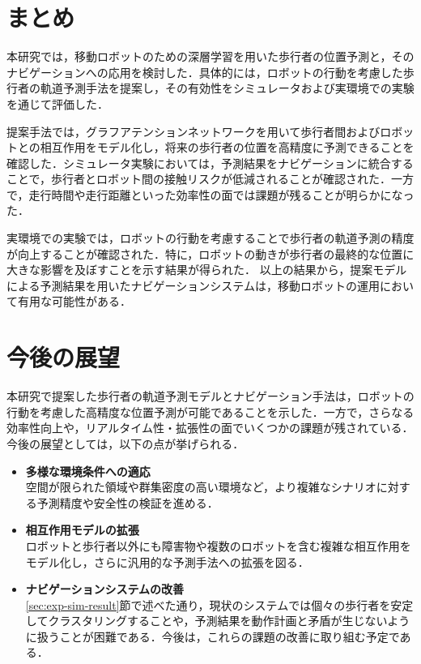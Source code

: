 
\section{まとめ}
本研究では，移動ロボットのための深層学習を用いた歩行者の位置予測と，そのナビゲーションへの応用を検討した．具体的には，ロボットの行動を考慮した歩行者の軌道予測手法を提案し，その有効性をシミュレータおよび実環境での実験を通じて評価した．

提案手法では，グラフアテンションネットワークを用いて歩行者間およびロボットとの相互作用をモデル化し，将来の歩行者の位置を高精度に予測できることを確認した．シミュレータ実験においては，予測結果をナビゲーションに統合することで，歩行者とロボット間の接触リスクが低減されることが確認された．一方で，走行時間や走行距離といった効率性の面では課題が残ることが明らかになった．

実環境での実験では，ロボットの行動を考慮することで歩行者の軌道予測の精度が向上することが確認された．特に，ロボットの動きが歩行者の最終的な位置に大きな影響を及ぼすことを示す結果が得られた．
以上の結果から，提案モデルによる予測結果を用いたナビゲーションシステムは，移動ロボットの運用において有用な可能性がある．

\newpage

\section{今後の展望}
本研究で提案した歩行者の軌道予測モデルとナビゲーション手法は，ロボットの行動を考慮した高精度な位置予測が可能であることを示した．一方で，さらなる効率性向上や，リアルタイム性・拡張性の面でいくつかの課題が残されている．今後の展望としては，以下の点が挙げられる．

\begin{itemize}
  \item \textbf{多様な環境条件への適応} \\
  空間が限られた領域や群集密度の高い環境など，より複雑なシナリオに対する予測精度や安全性の検証を進める．
  \item \textbf{相互作用モデルの拡張} \\
  ロボットと歩行者以外にも障害物や複数のロボットを含む複雑な相互作用をモデル化し，さらに汎用的な予測手法への拡張を図る．
  \item \textbf{ナビゲーションシステムの改善} \\
  \ref{sec:exp-sim-result}節で述べた通り，現状のシステムでは個々の歩行者を安定してクラスタリングすることや，予測結果を動作計画と矛盾が生じないように扱うことが困難である．今後は，これらの課題の改善に取り組む予定である．
\end{itemize}

\newpage